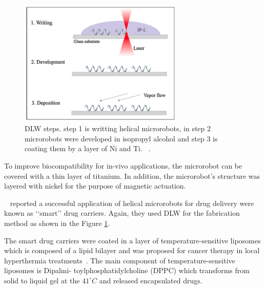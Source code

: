 \documentclass[12pt,a4paper,titlepage]{report}
\begin{document}
\begin{figure}
  \centering
    \includegraphics[width=0.7\textwidth]{tempreture}
  \caption{DLW steps. step 1 is writting helical microrobots, in step 2 microrobots were 
developed in isopropyl alcohol and step 3 is coating them by a layer of Ni and Ti. ~\citep{qiu2014artificial}.}
  \label{tempreture}
\end{figure}




To improve biocompatibility for in-vivo applications, the 
microrobot can be covered with a thin layer of titanium. In addition, the microrobot\rq{}s structure was layered with 
nickel for the purpose of magnetic actuation.

\citeauthor{qiu2014artificial}~\citep{qiu2014artificial} reported a successful application of helical microrobots
for drug delivery were known as \lq\lq{}smart\rq\rq{} drug carriers. Again, they used DLW for the fabrication method 
as shown in the Figure \ref{tempreture}. 



The smart drug carriers were coated in a layer of temperature-sensitive liposomes which is composed 
of a lipid bilayer and was proposed for cancer therapy in local hyperthermia treatments~\citep{qiu2014artificial}.
The main component of temperature-sensitive liposomes is Dipalmi- toylphosphatidylcholine (DPPC) which
transforms from solid to liquid gel at the $41^{\circ} C$ and released encapsulated drugs.
\end{document}
